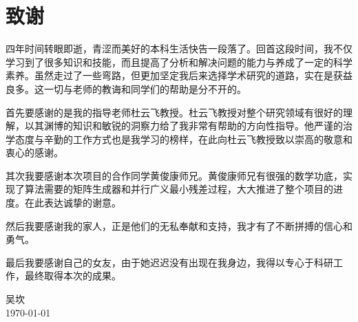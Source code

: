 
\chapter{致谢}

四年时间转眼即逝，青涩而美好的本科生活快告一段落了。回首这段时间，我不仅学习到了很多知识和技能，而且提高了分析和解决问题的能力与养成了一定的科学素养。虽然走过了一些弯路，但更加坚定我后来选择学术研究的道路，实在是获益良多。这一切与老师的教诲和同学们的帮助是分不开的。

首先要感谢的是我的指导老师杜云飞教授。杜云飞教授对整个研究领域有很好的理解，以其渊博的知识和敏锐的洞察力给了我非常有帮助的方向性指导。他严谨的治学态度与辛勤的工作方式也是我学习的榜样，在此向杜云飞教授致以崇高的敬意和衷心的感谢。

其次我要感谢本次项目的合作同学黄俊康师兄。黄俊康师兄有很强的数学功底，实现了算法需要的矩阵生成器和并行广义最小残差过程，大大推进了整个项目的进度。在此表达诚挚的谢意。

然后我要感谢我的家人，正是他们的无私奉献和支持，我才有了不断拼搏的信心和勇气。

最后我要感谢自己的女友，由于她迟迟没有出现在我身边，我得以专心于科研工作，最终取得本次的成果。

\vskip 108pt
\begin{flushright}
	吴坎\makebox[1.2cm]{} \\
	\today
\end{flushright}
